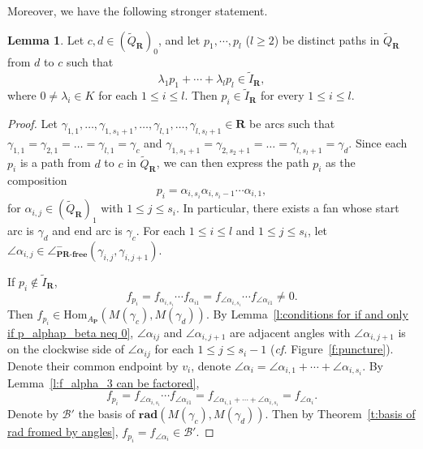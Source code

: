 \documentclass[a4paper,10pt]{amsart}
\theoremstyle{plain}          %
\theoremstyle{definition}
\newtheorem{lem}[theorem]{Lemma}
\def\RR{\mathbf{R}}
\def\af{\mathbf{a}}
\def\PP{\mathbf{P}}
\newcommand{\Hom}{\mathrm{Hom}}
\newcommand{\ha}{\angle^-}
\begin{document}
Moreover, we have the following stronger statement.
\begin{lem}\label{l: only zero relation}
Let $c,d\in (\widetilde{Q}_{\mathbf{R}})_0$, and let $p_1,\cdots,p_l$ ($l\ge 2$) be distinct paths in $\widetilde{Q}_{\mathbf{R}}$ from $d$ to $c$ such that $$\lambda_1{p_1}+\cdots+\lambda_l{p_l}\in \widetilde{I}_{\mathbf{R}},$$where $0\neq \lambda_i\in K$ for each $1\leq i\leq l$. Then $p_i\in \widetilde{I}_{\mathbf{R}}$ for every $1\leq i\leq l$.
\end{lem}
\begin{proof}



Let $\gamma_{1,1}, \dots, \gamma_{1,s_1+1}, \dots, \gamma_{l,1}, \dots, \gamma_{l,s_l+1} \in \mathbf{R}$ be arcs such that $\gamma_{1,1}=\gamma_{2,1}=\dots= \gamma_{l,1}=\gamma_c$ and $\gamma_{1,s_1+1}=\gamma_{2,s_2+1}=\dots=\gamma_{l,s_l+1}=\gamma_d$. Since each $p_i$ is a path from $d$ to $c$ in $\widetilde{Q}_{\mathbf{R}}$, we can then express the path $p_i$ as the composition $$p_i = \alpha_{i,s_i} \alpha_{i,s_i-1} \cdots \alpha_{i,1},$$ for $\alpha_{i,j}\in (\widetilde{Q}_{\RR})_1$ with $1\le j\le s_i$.
In particular, there exists a fan  whose start arc is $\gamma_d$ and end arc is $\gamma_c$. For each $1 \le i \le l$ and $1 \le j \le s_i$, let $\angle\alpha_{i,j} \in \ha_{\textbf{PR-free}}(\gamma_{i,j}, \gamma_{i,j+1})$. 

 

If $p_i\notin \widetilde{I}_{\mathbf{R}}$, 
$$f_{p_i}=f_{\alpha_{i,s_i}}\cdots f_{\alpha_{i1}}=f_{\angle\alpha_{i,s_i}}\cdots f_{\angle\alpha_{i1}}\neq 0.$$ Then $f_{p_i}\in\Hom_{A_{\PP}}(M(\gamma_c),M(\gamma_d))$.
By Lemma~\ref{l:conditions for if and only if p_alphap_beta neq 0},  $\angle\alpha_{ij}$ and $\angle\alpha_{i,j+1}$ are adjacent angles with $\angle\alpha_{i,j+1}$ is on the clockwise side of $\angle\alpha_{ij}$ for each $1\leq j\leq s_i-1$ ({\em cf.} Figure~\ref{f:puncture}). Denote their common endpoint by $v_{i}$, denote $\angle\alpha_i=\angle\alpha_{i,1}+\cdots+\angle\alpha_{i,s_i}$.
By Lemma~\ref{l:f_alpha_3 can be factored}, $$f_{p_i}=f_{\angle\alpha_{i,s_i}}\cdots f_{\angle\alpha_{i1}}=f_{\angle\alpha_{i,1}+\cdots+\angle\alpha_{i,s_i}}=f_{\angle\alpha_i}.$$  Denote by $\mathcal{B}'$    the  basis of $\mathbf{rad}(M(\gamma_c),M(\gamma_d))$. Then by Theorem~\ref{t:basis of rad fromed by angles}, $f_{p_i}=f_{\angle \alpha_i}\in \mathcal{B}'$. 


\end{proof}
\end{document}
